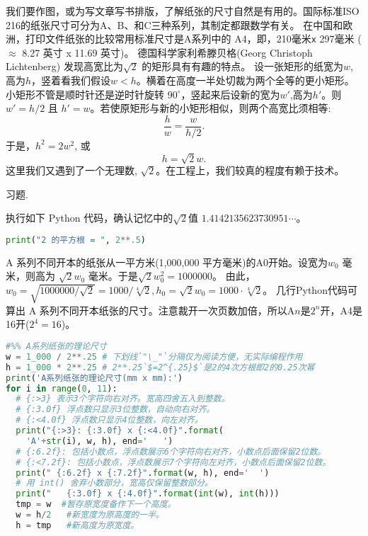 我们要作图，或为写文章写书排版，了解纸张的尺寸自然是有用的。国际标准ISO 216的纸张尺寸可分为A、B、和C三种系列，其制定都跟数学有关。
在中国和欧洲，打印文件纸张的比较常用标准尺寸是A系列中的 A4，即，210毫米\texttt{x}{ }297毫米 ($\approx$ 8.27 英寸 x 11.69 英寸)。
 德国科学家利希滕贝格(Georg Christoph Lichtenberg) 发现高宽比为$\sqrt{2}$
的矩形具有有趣的特点。
设一张矩形的纸宽为$w$,高为$h$，竖着看我们假设$w <h$。横着在高度一半处切裁为两个全等的更小矩形。小矩形不管是顺时针还是逆时针旋转 $90^\circ$，竖起来后设新的宽为$w'$,高为$h'$。则
$w' = h/2$ 且 $h' = w$。若使原矩形与新的小矩形相似，则两个高宽比须相等:
$$\frac{h}{w} = \frac{w}{h/2}.   $$
于是，$h^2= 2 w^2$, 或
 $$h= \sqrt{2} w.$$
这里我们又遇到了一个无理数, $\sqrt{2}$。在工程上，我们较真的程度有赖于技术。
	
\begin{kaishu}习题.\end{kaishu} 执行如下 Python 代码，确认记忆中的$\sqrt{2}$值 $1.4142135623730951\cdots$。
\begin{spacing}{0.8}
	\begin{small}
	\begin{lstlisting}[language=Python]
print("2 的平方根 = ", 2**.5)
\end{lstlisting}
\end{small}
\end{spacing}

A 系列不同开本的纸张从一平方米(1,000,000 平方毫米)的A0开始。设宽为$w_0$ 毫米，则高为
$\sqrt{2}w_0$ 毫米。于是$\sqrt{2}w_0^2 = 1000000$。
由此，
$w_0 = \sqrt{1000000/\sqrt{2}}=1000/\sqrt[4]{2}, 
h_0=\sqrt{2}w_0=1000\cdot\sqrt[4]{2}$。
几行Python代码可算出 A 系列不同开本纸张的尺寸。注意裁开一次页数加倍，所以A$n$是$2^n$开，A4是16开($2^4=16$)。

\vspace{.4cm}
\begin{spacing}{0.8}
	\begin{small}
	\begin{lstlisting}[language=Python]
#%% A系列纸张的理论尺寸
w = 1_000 / 2**.25 # 下划线`"\_"`分隔仅为阅读方便，无实际编程作用
h = 1_000 * 2**.25 # 2**.25`$=2^{.25}$`是2的4次方根即2的0.25次幂
print('A系列纸张的理论尺寸(mm x mm):')
for i in range(0, 11):
  # {:>3} 表示3个字符向右对齐。宽高四舍五入到整数。
  # {:3.0f} 浮点数只显示3位整数，自动向右对齐。
  # {:<4.0f} 浮点数只显示4位整数，向左对齐。
  print("{:>3}: {:3.0f} x {:<4.0f}".format(
    'A'+str(i), w, h), end='   ')
  # {:6.2f}: 包括小数点，浮点数展示6个字符向右对齐，小数点后面保留2位数。
  # {:<7.2f}: 包括小数点，浮点数展示7个字符向左对齐，小数点后面保留2位数。
  print(" {:6.2f} x {:7.2f}".format(w, h), end='  ')
  # 用 int() 舍弃小数部分，宽高仅保留整数部分。
  print("   {:3.0f} x {:4.0f}".format(int(w), int(h)))
  tmp = w  #暂存原宽度备作下一个高度。
  w = h/2   #新宽度为原高度的一半。
  h = tmp   #新高度为原宽度。
\end{lstlisting}
\end{small}
\end{spacing}
\vspace{.4cm}\label{a_paper_py}

